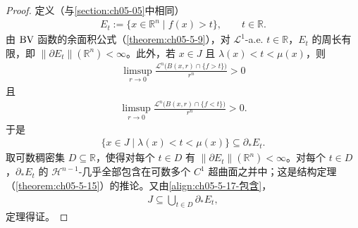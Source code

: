 \documentclass[../../main.tex]{subfiles}%
\begin{document}
\begin{proof}
定义（与\cref{section:ch05-05}中相同） %
\begin{align*}
E_t:=\{x\in\mathbb{R}^n\mid f(x)>t\},\qquad t\in\mathbb{R}.
\end{align*}
由 $\mathrm{BV}$ 函数的余面积公式（\cref{theorem:ch05-5-9}），对 $\mathcal{L}^1$-a.e. $t\in\mathbb{R}$，$E_t$ 的周长有限，即 $\lVert\partial E_t\rVert(\mathbb{R}^n)<\infty$。此外，若 $x\in J$ 且 $\lambda(x)<t<\mu(x)$，则 %
\begin{align*}
\limsup_{r\to0}\frac{\mathcal{L}^n\bigl(B(x,r)\cap\{f>t\}\bigr)}{r^n}>0
\end{align*}
且
\begin{align*}
\limsup_{r\to0}\frac{\mathcal{L}^n\bigl(B(x,r)\cap\{f<t\}\bigr)}{r^n}>0 .
\end{align*}
于是
\begin{align}
\{x\in J\mid\lambda(x)<t<\mu(x)\}\subseteq\partial_*E_t . \label{align:ch05-5-17-包含}
\end{align}
取可数稠密集 $D\subseteq\mathbb{R}$，使得对每个 $t\in D$ 有 $\lVert\partial E_t\rVert(\mathbb{R}^n)<\infty$。对每个 $t\in D$，$\partial_*E_t$ 的 $\mathcal{H}^{n-1}$-几乎全部包含在可数多个 $C^1$ 超曲面之并中；这是结构定理（\cref{theorem:ch05-5-15}）的推论。又由\eqref{align:ch05-5-17-包含}， %
\begin{align*}
J\subseteq\bigcup_{t\in D}\partial_*E_t ,
\end{align*}
定理得证。
\end{proof}
\end{document}
